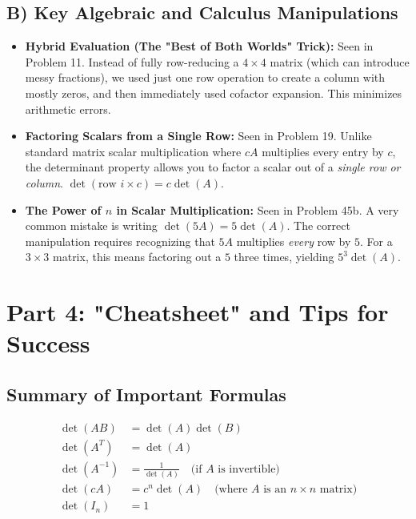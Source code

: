 \documentclass{article}
\begin{document}
\subsection{B) Key Algebraic and Calculus Manipulations}
\begin{itemize}
    \item \textbf{Hybrid Evaluation (The "Best of Both Worlds" Trick):} Seen in Problem 11. Instead of fully row-reducing a $4 \times 4$ matrix (which can introduce messy fractions), we used just one row operation to create a column with mostly zeros, and then immediately used cofactor expansion. This minimizes arithmetic errors.
    \item \textbf{Factoring Scalars from a Single Row:} Seen in Problem 19. Unlike standard matrix scalar multiplication where $cA$ multiplies every entry by $c$, the determinant property allows you to factor a scalar out of a \textit{single row or column}. $\det(\text{row } i \times c) = c \det(A)$.
    \item \textbf{The Power of $n$ in Scalar Multiplication:} Seen in Problem 45b. A very common mistake is writing $\det(5A) = 5 \det(A)$. The correct manipulation requires recognizing that $5A$ multiplies \textit{every} row by $5$. For a $3 \times 3$ matrix, this means factoring out a $5$ three times, yielding $5^3 \det(A)$.
\end{itemize}

\newpage
\section{Part 4: "Cheatsheet" and Tips for Success}

\subsection{Summary of Important Formulas}
\begin{align*}
    \det(AB) &= \det(A)\det(B) \\
    \det(A^T) &= \det(A) \\
    \det(A^{-1}) &= \frac{1}{\det(A)} \quad \text{(if } A \text{ is invertible)} \\
    \det(cA) &= c^n \det(A) \quad \text{(where } A \text{ is an } n \times n \text{ matrix)} \\
    \det(I_n) &= 1
\end{align*}
\end{document}
